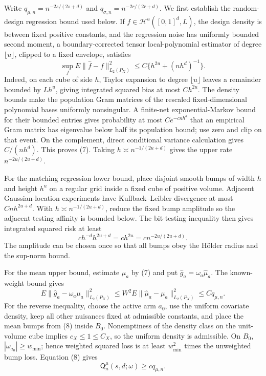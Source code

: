 Write \(q_{\mu,n}=n^{-2s/(2s+d)}\) and \(q_{\sigma,n}=n^{-2r/(2r+d)}\).  We first establish the random-design regression bound used below.  If \(f\in\mathcal H^u([0,1]^d,L)\), the design density is between fixed positive constants, and the regression noise has uniformly bounded second moment, a boundary-corrected tensor local-polynomial estimator of degree \(\lfloor u\rfloor\), clipped to a fixed envelope, satisfies
\[
\sup_f E\|\widehat f-f\|_{L_2(P_X)}^2
\leq C\{h^{2u}+(nh^d)^{-1}\}.
\tag{7}
\]
Indeed, on each cube of side \(h\), Taylor expansion to degree \(\lfloor u\rfloor\) leaves a remainder bounded by \(Lh^u\), giving integrated squared bias at most \(Ch^{2u}\).  The density bounds make the population Gram matrices of the rescaled fixed-dimensional polynomial bases uniformly nonsingular.  A finite-net exponential-Markov bound for their bounded entries gives probability at most \(Ce^{-cnh^d}\) that an empirical Gram matrix has eigenvalue below half its population bound; use zero and clip on that event.  On the complement, direct conditional variance calculation gives \(C/(nh^d)\).  This proves (7).  Taking \(h\asymp n^{-1/(2u+d)}\) gives the upper rate \(n^{-2u/(2u+d)}\).

For the matching regression lower bound, place disjoint smooth bumps of width \(h\) and height \(h^u\) on a regular grid inside a fixed cube of positive volume.  Adjacent Gaussian-location experiments have Kullback--Leibler divergence at most \(Cnh^{2u+d}\).  With \(h\asymp n^{-1/(2u+d)}\), reduce the fixed bump amplitude so the adjacent testing affinity is bounded below.  The bit-testing inequality then gives integrated squared risk at least
\[
c h^{-d}h^{2u+d}=ch^{2u}=c n^{-2u/(2u+d)}.
\tag{8}
\]
The amplitude can be chosen once so that all bumps obey the Hölder radius and the sup-norm bound.

For the mean upper bound, estimate \(\mu_a\) by (7) and put \(\widehat g_a=\omega_a\widehat\mu_a\).  The known-weight bound gives
\[
E\|\widehat g_a-\omega_a\mu_a\|_{L_2(P_X)}^2
\leq W^2E\|\widehat\mu_a-\mu_a\|_{L_2(P_X)}^2
\leq Cq_{\mu,n}.
\tag{9}
\]
For the reverse inequality, choose the active arm \(a_0\), use the uniform covariate density, keep all other nuisances fixed at admissible constants, and place the mean bumps from (8) inside \(B_0\).  Nonemptiness of the density class on the unit-volume cube implies \(c_X\leq1\leq C_X\), so the uniform density is admissible.  On \(B_0\), \(|\omega_{a_0}|\geq w_{\min}\); hence weighted squared loss is at least \(w_{\min}^2\) times the unweighted bump loss.  Equation (8) gives
\[
\mathsf Q_n^{\mu}(s,d;\omega)\geq cq_{\mu,n}.
\tag{10}
\]

